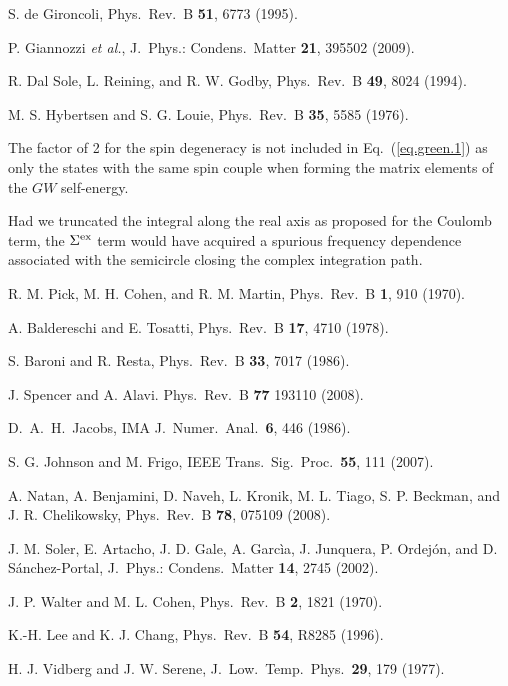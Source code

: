 \documentclass[twocolumn,prb,showpacs,superscriptaddress]{revtex4}
\begin{document}
\begin{thebibliography}{99}
S. de Gironcoli,
Phys.\ Rev.\ B {\bf 51}, 6773 (1995).

P. Giannozzi {\it et al.},
J.\ Phys.: Condens.\ Matter {\bf 21}, 395502 (2009).

R. Dal Sole, L. Reining, and R. W. Godby,
Phys.\ Rev.\ B {\bf 49}, 8024 (1994).

M. S. Hybertsen and S. G. Louie,
Phys.\ Rev.\ B {\bf 35}, 5585 (1976).

The factor of 2 for the spin degeneracy is not included in Eq.\ (\ref{eq.green.1})
as only the states with the same spin couple when forming the 
matrix elements of the $GW$ self-energy.\cite{hl86}

Had we truncated the integral along the real axis as proposed for the Coulomb term, 
the $\Sigma^{\rm ex}$ term would have acquired a spurious frequency dependence associated with
the semicircle closing the complex integration path.

R. M. Pick, M. H. Cohen, and R. M. Martin,
Phys.\ Rev.\ B {\bf 1}, 910 (1970). 

A. Baldereschi and E. Tosatti,
Phys.\ Rev.\ B {\bf 17}, 4710 (1978).

S. Baroni and R. Resta,
Phys.\ Rev.\ B {\bf 33}, 7017 (1986).

J. Spencer and A. Alavi.
Phys.\ Rev.\ B {\bf 77} 193110 (2008).

D.\ A.\ H.\ Jacobs,
IMA J.\ Numer.\ Anal.\ {\bf 6}, 446 (1986).

S. G. Johnson and M. Frigo,
IEEE Trans.\ Sig.\ Proc.\ {\bf 55}, 111 (2007).

A. Natan, A. Benjamini, D. Naveh, L. Kronik, M. L. Tiago, S. P. Beckman, and J. R. Chelikowsky,
Phys.\ Rev.\ B {\bf 78}, 075109 (2008).

J. M. Soler, E. Artacho, J. D. Gale, A. Garc\`ia, J. Junquera, P. Ordej\'on, and D. S\'anchez-Portal,
J.\ Phys.: Condens.\ Matter {\bf 14}, 2745 (2002).

J. P. Walter and M. L. Cohen,
Phys.\ Rev.\ B {\bf 2}, 1821 (1970).

K.-H. Lee and K. J. Chang,
Phys.\ Rev.\ B {\bf 54}, R8285 (1996).

H. J. Vidberg and J. W. Serene,
J.\ Low.\ Temp.\ Phys.\ {\bf 29}, 179 (1977).


\end{thebibliography}
\end{document}

